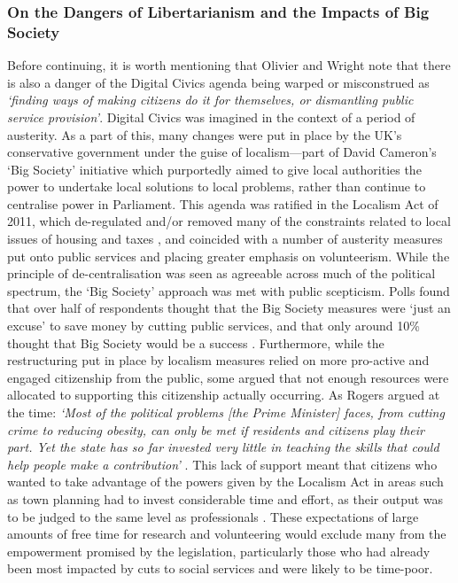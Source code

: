 \subsubsection{On the Dangers of Libertarianism and the Impacts of Big Society}
Before continuing, it is worth mentioning that Olivier and Wright note that there is also a danger of the Digital Civics agenda being warped or misconstrued as \textit{`finding ways of making citizens do it for themselves, or dismantling public service provision'}. Digital Civics was imagined in the context of a period of austerity. As a part of this, many changes were put in place by the UK's conservative government under the guise of localism---part of David Cameron's `Big Society' initiative which purportedly aimed to give local authorities the power to undertake local solutions to local problems, rather than continue to centralise power in Parliament. This agenda was ratified in the Localism Act of 2011, which de-regulated and/or removed many of the constraints related to local issues of housing and taxes \citep{MinistryofHousingCommunities&LocalGovernment2011}, and coincided with a number of austerity measures put onto public services and placing greater emphasis on volunteerism. While the principle of de-centralisation was seen as agreeable across much of the political spectrum, the `Big Society' approach was met with public scepticism. Polls found that over half of respondents thought that the Big Society measures were `just an excuse' to save money by cutting public services, and that only around 10\% thought that Big Society would be a success \citep{Ferragina2017a}. Furthermore, while the restructuring put in place by localism measures relied on more pro-active and engaged citizenship from the public, some argued that not enough resources were allocated to supporting this citizenship actually occurring. As Rogers argued at the time: \textit{`Most of the political problems [the Prime Minister] faces, from cutting crime to reducing obesity, can only be met if residents and citizens play their part. Yet the state has so far invested very little in teaching the skills that could help people make a contribution'} \citep{BenRogers2010a}. This lack of support meant that citizens who wanted to take advantage of the powers given by the Localism Act in areas such as town planning had to invest considerable time and effort, as their output was to be judged to the same level as professionals \citep{BBCSundayPolitics2013}. These expectations of large amounts of free time for research and volunteering would exclude many from the empowerment promised by the legislation, particularly those who had already been most impacted by cuts to social services and were likely to be time-poor.


